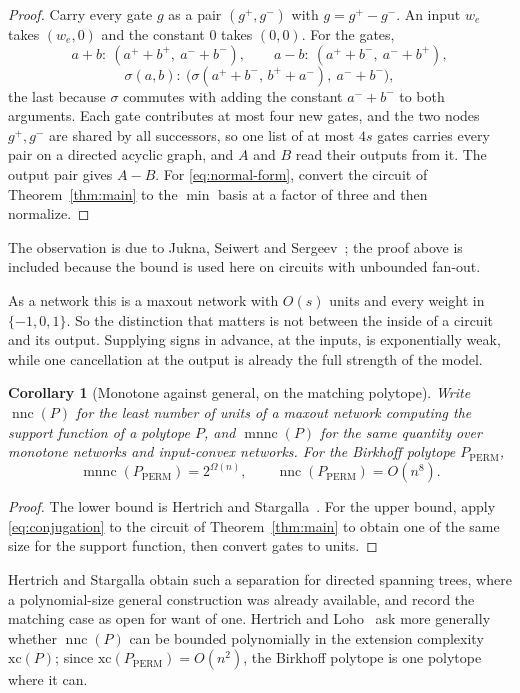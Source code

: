 \documentclass[11pt]{article}
\newtheorem{corollary}[theorem]{Corollary}
\newcommand{\nnc}{\operatorname{nnc}}
\newcommand{\mnnc}{\operatorname{mnnc}}
\begin{document}
\begin{proof}
Carry every gate $g$ as a pair $(g^{+},g^{-})$ with $g=g^{+}-g^{-}$.  An input
$w_e$ takes $(w_e,0)$ and the constant $0$ takes $(0,0)$.  For the gates,
\[
  a+b:\ (a^{+}{+}b^{+},\ a^{-}{+}b^{-}),
  \qquad
  a-b:\ (a^{+}{+}b^{-},\ a^{-}{+}b^{+}),
\]
\[
  \sigma(a,b):\ \bigl(\sigma(a^{+}{+}b^{-},\,b^{+}{+}a^{-}),\ a^{-}{+}b^{-}\bigr),
\]
the last because $\sigma$ commutes with adding the constant $a^{-}{+}b^{-}$ to
both arguments.  Each gate contributes at most four new gates, and the two nodes
$g^{+},g^{-}$ are shared by all successors, so one list of at most $4s$ gates
carries every pair on a directed acyclic graph, and $A$ and $B$ read their
outputs from it.  The output pair gives $A-B$.  For
\eqref{eq:normal-form}, convert the circuit of Theorem~\ref{thm:main} to the
$\min$ basis at a factor of three and then normalize.
\end{proof}

The observation is due to Jukna, Seiwert and
Sergeev~\cite{jukna-seiwert-sergeev20}; the proof above is included because the
bound is used here on circuits with unbounded fan-out.

As a network this is a maxout network with $O(s)$ units and every weight in
$\{-1,0,1\}$.  So the distinction that matters is not between the inside of a
circuit and its output.  Supplying signs in advance, at the inputs, is
exponentially weak, while one cancellation at the output is already the full
strength of the model.

\begin{corollary}[Monotone against general, on the matching polytope]
\label{cor:monotone-separation}
Write $\nnc(P)$ for the least number of units of a maxout network computing the
support function of a polytope $P$, and $\mnnc(P)$ for the same quantity over
monotone networks and input-convex networks.  For the Birkhoff polytope
$P_{\mathrm{PERM}}$,
\[
  \mnnc(P_{\mathrm{PERM}})=2^{\Omega(n)},
  \qquad
  \nnc(P_{\mathrm{PERM}})=O(n^{8}).
\]
\end{corollary}

\begin{proof}
The lower bound is Hertrich and Stargalla~\cite{hertrich-stargalla26}.  For the
upper bound, apply \eqref{eq:conjugation} to the circuit of
Theorem~\ref{thm:main} to obtain one of the same size for the support function,
then convert gates to units.
\end{proof}

Hertrich and Stargalla obtain such a separation for directed spanning trees,
where a polynomial-size general construction was already available, and record
the matching case as open for want of one.  Hertrich and
Loho~\cite{hertrich-loho26} ask more generally whether $\nnc(P)$ can be bounded
polynomially in the extension complexity $\mathrm{xc}(P)$; since
$\mathrm{xc}(P_{\mathrm{PERM}})=O(n^{2})$, the Birkhoff polytope is one polytope
where it can.
\end{document}
